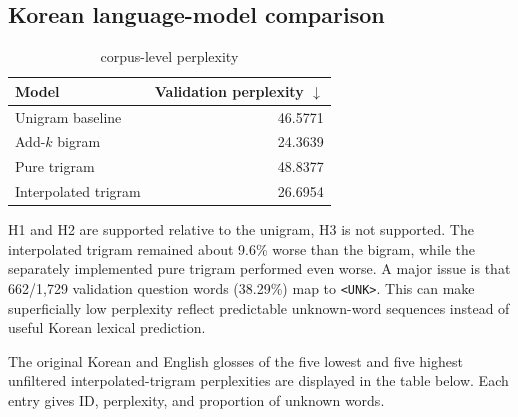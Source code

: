 \documentclass[11pt,a4paper,twocolumn]{article}
\begin{document}
\subsection{Korean language-model comparison}
\begin{table}[htbp]
\centering\footnotesize
\begin{tabular}{@{}lr@{}}
\toprule
Model & Validation perplexity $\downarrow$ \\
\midrule
Unigram baseline & 46.5771 \\
Add-$k$ bigram & 24.3639 \\
Pure trigram  & 48.8377 \\
Interpolated trigram & 26.6954 \\
\bottomrule
\end{tabular}
\caption{corpus-level perplexity}
\label{tab:lm}
\end{table}

H1 and H2 are supported relative to the unigram, H3 is not supported. The interpolated trigram remained about 9.6\% worse than the bigram, while the separately implemented pure trigram performed even worse. A major issue is that 662/1,729 validation question words (38.29\%) map to \texttt{<UNK>}. This can make superficially low perplexity reflect predictable unknown-word sequences instead of useful Korean lexical prediction.

The original Korean and English glosses of the five lowest and five highest unfiltered interpolated-trigram perplexities are displayed in the table below. Each entry gives ID, perplexity, and proportion of unknown words.
\end{document}
